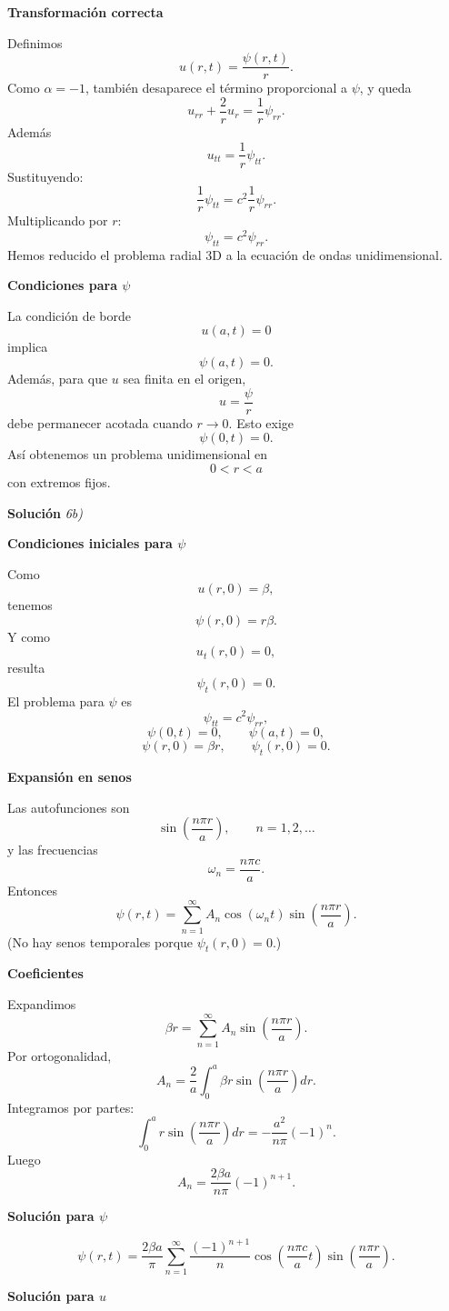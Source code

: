 \documentclass[11pt,spanish]{article}
\newcounter{problema}
\begin{document}
{\bf Transformación correcta}

Definimos
$$
\boxed{
u(r,t)=\frac{\psi(r,t)}{r}.
}
$$
Como $\alpha=-1$, también desaparece el término proporcional a $\psi$, y queda
$$
u_{rr}+\frac2r u_r
=
\frac1r\psi_{rr}.
$$
Además
$$
u_{tt}
=
\frac1r\psi_{tt}.
$$
Sustituyendo:
$$
\frac1r\psi_{tt}
=
c^2\frac1r\psi_{rr}.
$$
Multiplicando por $r$:
$$
\boxed{
\psi_{tt}
=
c^2\psi_{rr}.
}
$$
Hemos reducido el problema radial 3D a la ecuación de ondas unidimensional.

{\bf Condiciones para $\psi$}

La condición de borde
$$
u(a,t)=0
$$
implica
$$
\boxed{\psi(a,t)=0.}
$$
Además, para que $u$ sea finita en el origen,
$$
u=\frac{\psi}{r}
$$
debe permanecer acotada cuando $r\to 0$.
Esto exige
$$
\boxed{\psi(0,t)=0.}
$$
Así obtenemos un problema unidimensional en
$$
0<r<a
$$
con extremos fijos.

\vspace{0.5cm}
{\bf Soluci\'on }{\em 6b)}
\vspace{0.5cm}

{\bf Condiciones iniciales para $\psi$}

Como
$$
u(r,0)=\beta,
$$
tenemos
$$
\psi(r,0)=r\beta.
$$
Y como
$$
u_t(r,0)=0,
$$
resulta
$$
\psi_t(r,0)=0.
$$
El problema para $\psi$ es
$$
\psi_{tt}=c^2\psi_{rr},
$$
$$
\psi(0,t)=0,
\qquad
\psi(a,t)=0,
$$
$$
\psi(r,0)=\beta r,
\qquad
\psi_t(r,0)=0.
$$

{\bf Expansión en senos}

Las autofunciones son
$$
\sin\left(\frac{n\pi r}{a}\right),
\qquad n=1,2,\dots
$$
y las frecuencias
$$
\omega_n
=
\frac{n\pi c}{a}.
$$
Entonces
$$
\psi(r,t)
=
\sum_{n=1}^{\infty}
A_n
\cos(\omega_n t)
\sin\left(\frac{n\pi r}{a}\right).
$$
(No hay senos temporales porque $\psi_t(r,0)=0$.)

{\bf Coeficientes}

Expandimos
$$
\beta r
=
\sum_{n=1}^{\infty}
A_n
\sin\left(\frac{n\pi r}{a}\right).
$$
Por ortogonalidad,
$$
A_n
=
\frac{2}{a}
\int_0^a
\beta r
\sin\left(\frac{n\pi r}{a}\right)
dr.
$$
Integramos por partes:
$$
\int_0^a
r\sin\left(\frac{n\pi r}{a}\right)dr
=
-\frac{a^2}{n\pi}(-1)^n.
$$
Luego
$$
A_n
=
\frac{2\beta a}{n\pi}
(-1)^{n+1}.
$$

{\bf Solución para $\psi$}

$$
\boxed{
\psi(r,t)
=
\frac{2\beta a}{\pi}
\sum_{n=1}^{\infty}
\frac{(-1)^{n+1}}{n}
\cos\left(\frac{n\pi c}{a}t\right)
\sin\left(\frac{n\pi r}{a}\right).
}
$$

{\bf Solución para $u$}
\end{document}
